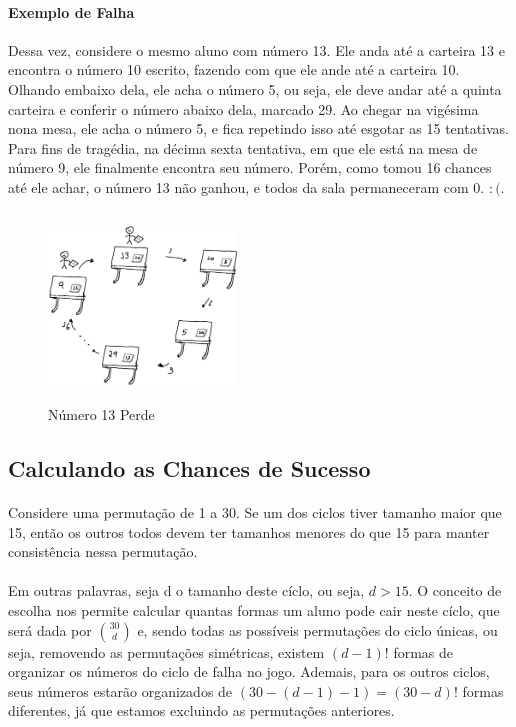 \documentclass{article}
\begin{document}
    \paragraph*{Exemplo de Falha}Dessa vez, considere o mesmo aluno com n\'umero 13. Ele anda at\'e a carteira 13 e encontra o n\'umero 10 escrito, fazendo com que ele
    ande at\'e a carteira 10. Olhando embaixo dela, ele acha o n\'umero 5, ou seja, ele deve andar at\'e a quinta carteira e conferir o n\'umero abaixo dela, marcado
    29. Ao chegar na vig\'esima nona mesa, ele acha o n\'umero 5, e fica repetindo isso at\'e esgotar as 15 tentativas. Para fins de trag\'edia, na d\'ecima sexta tentativa,
    em que ele est\'a na mesa de n\'umero 9, ele finalmente encontra seu n\'umero. Por\'em, como tomou 16 chances at\'e ele achar, o n\'umero 13 n\~ao ganhou, e todos da
    sala permaneceram com 0. $:(.$
    \begin{figure}
        \includegraphics[width=5cm, height=5cm]{Lose.png}
        \centering
        \caption{N\'umero 13 Perde}
    \end{figure}

    \newpage
    \subsection{Calculando as Chances de Sucesso}    

        \paragraph{}Considere uma permuta\c c\~ao de 1 a 30. Se um dos ciclos tiver tamanho maior que 15, ent\~ao os outros todos devem ter tamanhos menores do que 15 para manter
        consist\^encia nessa permuta\c c\~ao. 
        
        \paragraph{}Em outras palavras, seja d o tamanho deste c\'iclo, ou seja, $d > 15$. O conceito de escolha nos permite calcular quantas 
        formas um aluno pode cair neste c\'iclo, que ser\'a dada por $\binom{30}{d}$ e, sendo todas as poss\'iveis permuta\c c\~oes do ciclo \'unicas, ou seja, removendo
        as permuta\c c\~oes sim\'etricas, existem $(d-1)!$ formas de organizar os n\'umeros do ciclo de falha no jogo. Ademais, para os outros ciclos, seus n\'umeros estar\~ao
        organizados de $(30 - (d - 1) - 1) = (30 - d)!$ formas diferentes, j\'a que estamos excluindo as permuta\c c\~oes anteriores.
\end{document}
